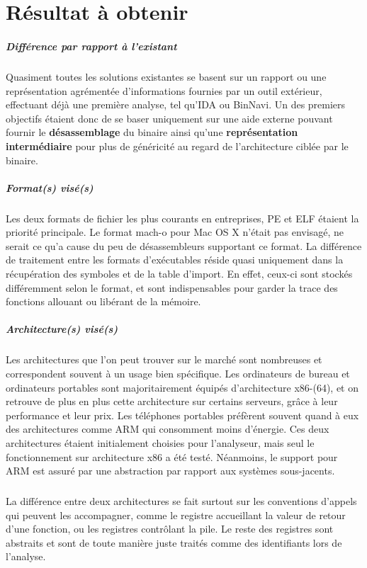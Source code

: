 \section{Résultat à obtenir}

\subparagraph{Différence par rapport à l'existant}

Quasiment toutes les solutions existantes se basent sur un rapport ou une représentation agrémentée d'informations fournies
par un outil extérieur, effectuant déjà une première analyse, tel qu'IDA ou BinNavi. Un des premiers objectifs étaient donc de
se baser uniquement sur une aide externe pouvant fournir le \textbf{désassemblage} du binaire ainsi qu'une \textbf{représentation intermédiaire}
pour plus de généricité au regard de l'architecture ciblée par le binaire.

\subparagraph{Format(s) visé(s)}

Les deux formats de fichier les plus courants en entreprises, PE et ELF étaient la priorité principale. Le format mach-o pour
Mac OS X n'était pas envisagé, ne serait ce qu'a cause du peu de désassembleurs supportant ce format. La différence de traitement
entre les formats d'exécutables réside quasi uniquement dans la récupération des symboles et de la table d'import. En effet, ceux-ci
sont stockés différemment selon le format, et sont indispensables pour garder la trace des fonctions allouant ou libérant de la mémoire.

\subparagraph{Architecture(s) visé(s)}
Les architectures que l'on peut trouver sur le marché sont nombreuses et correspondent souvent à un usage bien spécifique.
Les ordinateurs de bureau et ordinateurs portables sont majoritairement équipés d'architecture x86-(64), et on retrouve de plus en plus
cette architecture sur certains serveurs, grâce à leur performance et leur prix. Les téléphones portables préfèrent souvent quand à eux
des architectures comme ARM qui consomment moins d'énergie. Ces deux architectures étaient initialement choisies pour l'analyseur, mais seul
le fonctionnement sur architecture x86 a été testé. Néanmoins, le support pour ARM est assuré par une abstraction par rapport aux systèmes
sous-jacents.
\subparagraph{}
La différence entre deux architectures se fait surtout sur les conventions d'appels qui peuvent les accompagner, comme le registre accueillant
la valeur de retour d'une fonction, ou les registres contrôlant la pile. Le reste des registres sont abstraits et sont de toute manière
juste traités comme des identifiants lors de l'analyse.



